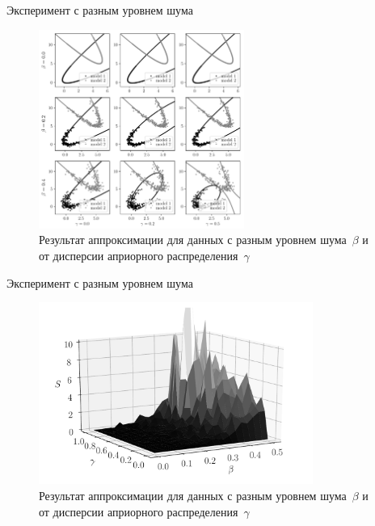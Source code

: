\documentclass[10pt,pdf,hyperref={unicode}]{beamer}
\begin{document}

\begin{frame}{Эксперимент с разным уровнем шума}
\justifying

\begin{figure}[h!t]\center
\includegraphics[width=0.6\textwidth]{figures/beta_gamma}
\caption{Результат аппроксимации для данных с разным уровнем шума~$\beta$ и от дисперсии априорного распределения~$\gamma$}
\label{ce:fig6}
\end{figure}

\end{frame}

\begin{frame}{Эксперимент с разным уровнем шума}
\justifying

\begin{figure}[h!t]\center
\includegraphics[width=0.8\textwidth]{figures/3dplot}
\caption{Результат аппроксимации для данных с разным уровнем шума~$\beta$ и от дисперсии априорного распределения~$\gamma$}
\label{ce:fig6}
\end{figure}

\end{frame}
\end{document}
